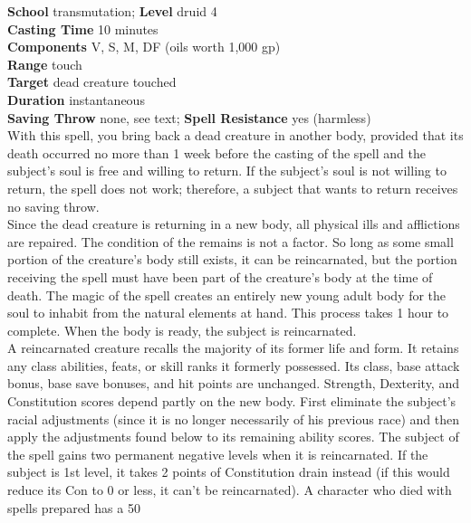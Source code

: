 \textbf{School }transmutation; \textbf{Level }druid 4\\
\textbf{Casting Time }10 minutes\\
\textbf{Components }V, S, M, DF (oils worth 1,000 gp)\\
\textbf{Range }touch\\
\textbf{Target }dead creature touched\\
\textbf{Duration }instantaneous\\
\textbf{Saving Throw }none, see text; \textbf{Spell Resistance }yes (harmless)\\
With this spell, you bring back a dead creature in another body, provided that its death occurred no more than 1 week before the casting of the spell and the subject's soul is free and willing to return. If the subject's soul is not willing to return, the spell does not work; therefore, a subject that wants to return receives no saving throw.\\
Since the dead creature is returning in a new body, all physical ills and afflictions are repaired. The condition of the remains is not a factor. So long as some small portion of the creature's body still exists, it can be reincarnated, but the portion receiving the spell must have been part of the creature's body at the time of death. The magic of the spell creates an entirely new young adult body for the soul to inhabit from the natural elements at hand. This process takes 1 hour to complete. When the body is ready, the subject is reincarnated.\\
A reincarnated creature recalls the majority of its former life and form. It retains any class abilities, feats, or skill ranks it formerly possessed. Its class, base attack bonus, base save bonuses, and hit points are unchanged. Strength, Dexterity, and Constitution scores depend partly on the new body. First eliminate the subject's racial adjustments (since it is no longer necessarily of his previous race) and then apply the adjustments found below to its remaining ability scores. The subject of the spell gains two permanent negative levels when it is reincarnated. If the subject is 1st level, it takes 2 points of Constitution drain instead (if this would reduce its Con to 0 or less, it can't be reincarnated). A character who died with spells prepared has a 50%
